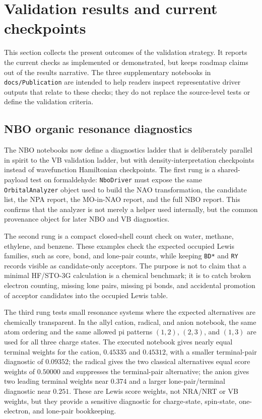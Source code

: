 \documentclass[11pt]{article}
\begin{document}
\section{Validation results and current checkpoints}

This section collects the present outcomes of the validation strategy.  It reports the current checks as implemented or demonstrated, but keeps roadmap claims out of the results narrative.  The three supplementary notebooks in \texttt{docs/Publication} are intended to help readers inspect representative driver outputs that relate to these checks; they do not replace the source-level tests or define the validation criteria.

\subsection{NBO organic resonance diagnostics}

The NBO notebooks now define a diagnostics ladder that is deliberately parallel in spirit to the VB validation ladder, but with density-interpretation checkpoints instead of wavefunction Hamiltonian checkpoints.  The first rung is a shared-payload test on formaldehyde: \texttt{NboDriver} must expose the same \texttt{OrbitalAnalyzer} object used to build the NAO transformation, the candidate list, the NPA report, the MO-in-NAO report, and the full NBO report.  This confirms that the analyzer is not merely a helper used internally, but the common provenance object for later NBO and VB diagnostics.

The second rung is a compact closed-shell count check on water, methane, ethylene, and benzene.  These examples check the expected occupied Lewis families, such as core, bond, and lone-pair counts, while keeping \texttt{BD*} and \texttt{RY} records visible as candidate-only acceptors.  The purpose is not to claim that a minimal HF/STO-3G calculation is a chemical benchmark; it is to catch broken electron counting, missing lone pairs, missing pi bonds, and accidental promotion of acceptor candidates into the occupied Lewis table.

The third rung tests small resonance systems where the expected alternatives are chemically transparent.  In the allyl cation, radical, and anion notebook, the same atom ordering and the same allowed pi patterns $(1,2)$, $(2,3)$, and $(1,3)$ are used for all three charge states.  The executed notebook gives nearly equal terminal weights for the cation, $0.45335$ and $0.45312$, with a smaller terminal-pair diagnostic of $0.09352$; the radical gives the two classical alternatives equal score weights of $0.50000$ and suppresses the terminal-pair alternative; the anion gives two leading terminal weights near $0.374$ and a larger lone-pair/terminal diagnostic near $0.251$.  These are Lewis score weights, not NRA/NRT or VB weights, but they provide a sensitive diagnostic for charge-state, spin-state, one-electron, and lone-pair bookkeeping.
\end{document}
